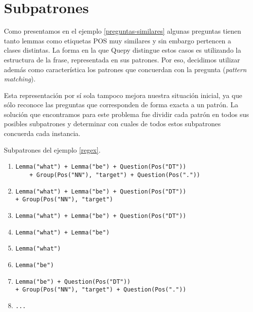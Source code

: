 \section{Subpatrones}

Como presentamos en el ejemplo \ref{preguntas-similares} algunas preguntas tienen tanto lemmas como etiquetas POS muy similares y sin embargo pertencen a clases distintas. La forma en la que Quepy distingue estos casos es utilizando la estructura de la frase, representada en sus patrones. Por eso, decidimos utilizar además como característica los patrones que concuerdan con la pregunta (\textit{pattern matching}).

Esta representación por sí sola tampoco mejora nuestra situación inicial, ya que sólo reconoce las preguntas que corresponden de forma exacta a un patrón. La solución que encontramos para este problema fue dividir cada patrón en todos sus posibles subpatrones y determinar con cuales de todos estos subpatrones concuerda cada instancia.

\begin{example} Subpatrones del ejemplo \ref{regex}.
\begin{enumerate}
\item \begin{lstlisting}
Lemma("what") + Lemma("be") + Question(Pos("DT"))
    + Group(Pos("NN"), "target") + Question(Pos("."))
\end{lstlisting}

\item
\begin{lstlisting}
Lemma("what") + Lemma("be") + Question(Pos("DT"))
+ Group(Pos("NN"), "target")
\end{lstlisting}

\item
\begin{lstlisting}
Lemma("what") + Lemma("be") + Question(Pos("DT"))
\end{lstlisting}

\item
\begin{lstlisting}
Lemma("what") + Lemma("be")
\end{lstlisting}

\item
\begin{lstlisting}
Lemma("what")
\end{lstlisting}

\item
\begin{lstlisting}
Lemma("be")
\end{lstlisting}

\item
\begin{lstlisting}
Lemma("be") + Question(Pos("DT"))
+ Group(Pos("NN"), "target") + Question(Pos("."))
\end{lstlisting}

\item
\begin{lstlisting}
...
\end{lstlisting}
\end{enumerate}
\end{example}

